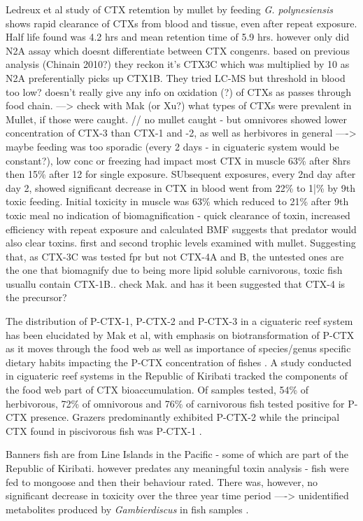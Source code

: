 \documentclass[12pt]{article}
\begin{document}
Ledreux et al study of CTX retemtion by mullet by feeding \emph{G. polynesiensis} shows rapid clearance of CTXs from blood and tissue, even after repeat exposure. Half life found was 4.2 hrs and mean retention time of 5.9 hrs. however only did N2A assay which doesnt differentiate between CTX congenrs. based on previous analysis (Chinain 2010?) they reckon it's CTX3C which was multiplied by 10 as  N2A preferentially picks up CTX1B. They tried LC-MS but threshold in blood too low? doesn't really give any info on oxidation (?) of CTXs as passes through food chain.
---> check with Mak (or Xu?) what types of CTXs were prevalent in Mullet, if those were caught. // no mullet caught - but omnivores showed lower concentration of CTX-3 than CTX-1 and -2, as well as herbivores in general 
----> maybe feeding was too sporadic (every 2 days - in ciguateric system would be constant?), low conc or freezing had impact
most CTX in muscle 63\% after 8hrs then 15\% after 12 for single exposure. SUbsequent exposures, every 2nd day after day 2, showed significant decrease in CTX in blood went from 22\% to 1|\% by 9th toxic feeding. Initial toxicity in muscle was 63\% which reduced to 21\% after 9th toxic meal
no indication of biomagnification - quick clearance of toxin, increased efficiency with repeat exposure and calculated BMF suggests that predator would also clear toxins. first and second trophic levels examined with mullet. Suggesting that, as CTX-3C was tested fpr but not CTX-4A and B, the untested ones are the one that biomagnify due to being more lipid soluble
carnivorous, toxic fish usuallu contain CTX-1B.. check Mak. and has it been suggested that CTX-4 is the precursor?

The distribution of P-CTX-1, P-CTX-2 and P-CTX-3 in a ciguateric reef system has been elucidated by Mak et al, with emphasis on biotransformation of P-CTX as it moves through the food web as well as importance of species/genus specific dietary habits impacting the P-CTX concentration of fishes \cite{mak2013pacific}.
A study conducted in ciguateric reef systems in the Republic of Kiribati tracked the components of the food web part of CTX bioaccumulation. Of samples tested, 54\% of herbivorous, 72\% of omnivorous and 76\% of carnivorous fish tested positive for P-CTX presence. Grazers predominantly exhibited P-CTX-2 while the principal CTX found in piscivorous fish was P-CTX-1 \cite{mak2013pacific}.

Banners fish are from Line Islands in the Pacific - some of which are part of the Republic of Kiribati. however predates any meaningful toxin analysis - fish were fed to mongoose and then their behaviour rated. There was, however, no significant decrease in toxicity over the three year time period \cite{banner1966retention}
----> unidentified metabolites produced by \emph{Gambierdiscus} in fish samples \cite{endean1993variation,vernoux1997isolation}.
\end{document}
